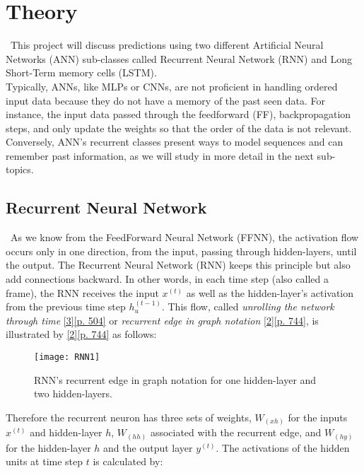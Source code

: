 \section{Theory}
\label{chap:Theory}

\quad \, This project will discuss predictions using two different Artificial Neural Networks (ANN) sub-classes called Recurrent Neural Network (RNN) and Long Short-Term memory cells (LSTM).\\

Typically, ANNs, like MLPs or CNNs, are not proficient in handling ordered input data because they do not have a memory of the past seen data. For instance, the input data passed through the feedforward (FF), backpropagation steps, and only update the weights so that the order of the data is not relevant. Conversely, ANN's recurrent classes present ways to model sequences and can remember past information, as we will study in more detail in the next sub-topics.

\subsection{Recurrent Neural Network}
\label{chap:Recurrent Neural Network}

\quad \, As we know from the FeedForward Neural Network (FFNN), the activation flow occurs only in one direction, from the input, passing through hidden-layers, until the output. The Recurrent Neural Network (RNN) keeps this principle but also add connections backward. In other words, in each time step (also called a frame), the RNN receives the input $x^{(t)}$ as well as the hidden-layer's activation from the previous time step $h_u^{(t-1)}$. This flow, called \textit{unrolling the network through time} \hyperref[Bib:Aurelien Geron]{[3][p. 504]} or \textit{recurrent edge in graph notation} \hyperref[Bib:Sebastian Raschka, Vahid Mirjalili]{[2][p. 744]}, is illustrated by \hyperref[Bib:Sebastian Raschka, Vahid Mirjalili]{[2][p. 744]} as follows:

\begin{figure}[H]
\label{fig:RNN1}
\centering
\texttt{[image: RNN1]}
\caption{RNN's recurrent edge in graph notation for one hidden-layer and two hidden-layers.}
\end{figure}

Therefore the recurrent neuron has three sets of weights, $W_{(xh)}$ for the inputs $x^{(t)}$ and hidden-layer $h$, $W_{(hh)}$ associated with the recurrent edge, and $W_{(hy)}$ for the hidden-layer $h$ and the output layer $y^{(t)}$. The activations of the hidden units at time step $t$ is calculated by:\\

